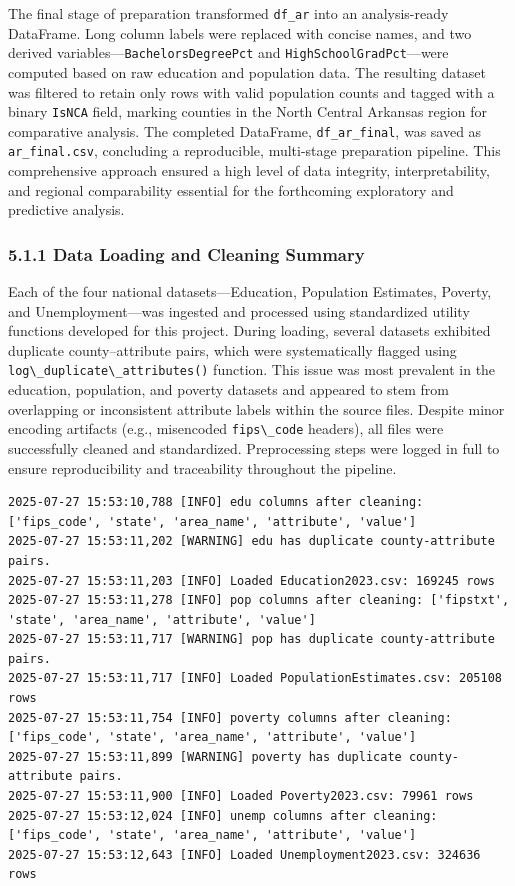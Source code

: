 \documentclass{llncs}
\begin{document}
The final stage of preparation transformed \texttt{df\_ar} into an analysis-ready DataFrame. Long column labels were replaced with concise names, and two derived variables---\texttt{BachelorsDegreePct} and \texttt{HighSchoolGradPct}---were computed based on raw education and population data. The resulting dataset was filtered to retain only rows with valid population counts and tagged with a binary \texttt{IsNCA} field, marking counties in the North Central Arkansas region for comparative analysis. The completed DataFrame, \texttt{df\_ar\_final}, was saved as \texttt{ar\_final.csv}, concluding a reproducible, multi-stage preparation pipeline. This comprehensive approach ensured a high level of data integrity, interpretability, and regional comparability essential for the forthcoming exploratory and predictive analysis.

\subsubsection{5.1.1 Data Loading and Cleaning Summary}

Each of the four national datasets—Education, Population Estimates, Poverty, and Unemployment—was ingested and processed using standardized utility functions developed for this project. During loading, several datasets exhibited duplicate county–attribute pairs, which were systematically flagged using \lstinline|log\_duplicate\_attributes()| function. This issue was most prevalent in the education, population, and poverty datasets and appeared to stem from overlapping or inconsistent attribute labels within the source files. Despite minor encoding artifacts (e.g., misencoded \lstinline|fips\_code| headers), all files were successfully cleaned and standardized. Preprocessing steps were logged in full to ensure reproducibility and traceability throughout the pipeline.

\begin{lstlisting}[caption={Logging Output from Data Loading Process}]
2025-07-27 15:53:10,788 [INFO] edu columns after cleaning: ['fips_code', 'state', 'area_name', 'attribute', 'value']
2025-07-27 15:53:11,202 [WARNING] edu has duplicate county-attribute pairs.
2025-07-27 15:53:11,203 [INFO] Loaded Education2023.csv: 169245 rows
2025-07-27 15:53:11,278 [INFO] pop columns after cleaning: ['fipstxt', 'state', 'area_name', 'attribute', 'value']
2025-07-27 15:53:11,717 [WARNING] pop has duplicate county-attribute pairs.
2025-07-27 15:53:11,717 [INFO] Loaded PopulationEstimates.csv: 205108 rows
2025-07-27 15:53:11,754 [INFO] poverty columns after cleaning: ['fips_code', 'state', 'area_name', 'attribute', 'value']
2025-07-27 15:53:11,899 [WARNING] poverty has duplicate county-attribute pairs.
2025-07-27 15:53:11,900 [INFO] Loaded Poverty2023.csv: 79961 rows
2025-07-27 15:53:12,024 [INFO] unemp columns after cleaning: ['fips_code', 'state', 'area_name', 'attribute', 'value']
2025-07-27 15:53:12,643 [INFO] Loaded Unemployment2023.csv: 324636 rows
\end{lstlisting}
\end{document}
